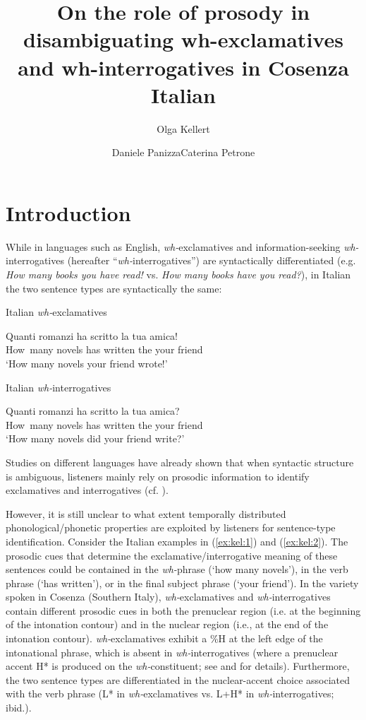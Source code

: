 \documentclass[output=paper]{langsci/langscibook}
\author{Olga Kellert\affiliation{Georg-August-Universität Göttingen}\and Daniele Panizza\affiliation{Georg-August-Universität Göttingen}\lastand Caterina Petrone\affiliation{Laboratoire Parole et Langage, Aix-Marseille Université}}
\title{On the role of prosody in disambiguating wh-exclamatives and wh-interrogatives in Cosenza Italian}
\begin{document}
\label{chap:kel}\label{ch:5}
 

  
 

\section{Introduction}

While in languages such as English, \textit{wh-}exclamatives and information-seeking \textit{wh-}interrogatives (hereafter “\textit{wh-}interrogatives”) are syntactically differentiated (e.g. \textit{How many books you have read!} vs. \textit{How many books have you read?}), in Italian the two sentence types are syntactically the same: 



\ea\label{ex:kel:1}
Italian \textit{wh-}exclamatives

\gll Quanti    romanzi  ha  scritto   la  tua  amica! \\
     How~many  novels   has written   the your friend\\
\glt `How many novels your friend wrote!'
\z


\ea\label{ex:kel:2}
 Italian \textit{wh-}interrogatives

\gll Quanti     romanzi  ha  scritto   la   tua amica?    \\
     How~many   novels   has written   the your friend\\
\glt `How many novels did your friend write?'
\z


Studies on different languages have already shown that when syntactic structure is ambiguous, listeners mainly rely on prosodic information to identify exclamatives and interrogatives (cf. \citealt{Batliner1988,Eady1986,Sorianello2011exclamative,Sorianello2012,Gyuris2013}). 

However, it is still unclear to what extent temporally distributed phonological/phonetic properties are exploited by listeners for sentence-type identification. Consider the Italian examples in (\ref{ex:kel:1}) and (\ref{ex:kel:2}). The prosodic cues that determine the exclamative/interrogative meaning of these sentences could be contained in the \textit{wh-}phrase (`how many novels’), in the verb phrase (`has written’), or in the final subject phrase (`your friend’). In the variety spoken in Cosenza (Southern Italy), \textit{wh-}exclamatives and \textit{wh-}interrogatives contain different prosodic cues in both the prenuclear region (i.e. at the beginning of the intonation contour) and in the nuclear region (i.e., at the end of the intonation contour). \textit{wh-}exclamatives exhibit a \%H at the left edge of the intonational phrase, which is absent in \textit{wh-}interrogatives (where a prenuclear accent H* is produced on the \textit{wh-}constituent; see \citealt{Sorianello2012} and  for details). Furthermore, the two sentence types are differentiated in the nuclear-accent choice associated with the verb phrase (L* in \textit{wh-}exclamatives vs. L+H* in \textit{wh-}interrogatives; ibid.).
\end{document}
